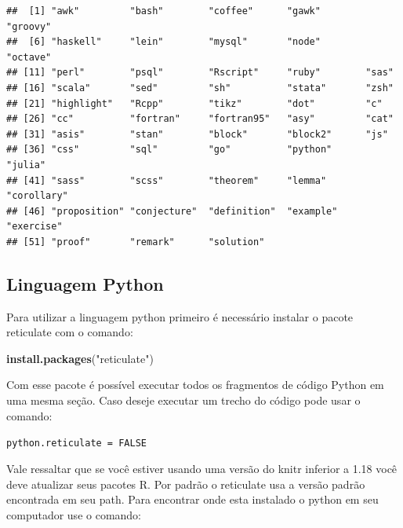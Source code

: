 \documentclass[
]{book}
\newenvironment{Shaded}{\begin{snugshade}}{\end{snugshade}}
\newcommand{\KeywordTok}[1]{\textcolor[rgb]{0.13,0.29,0.53}{\textbf{#1}}}
\newcommand{\NormalTok}[1]{#1}
\newcommand{\OperatorTok}[1]{\textcolor[rgb]{0.81,0.36,0.00}{\textbf{#1}}}
\newcommand{\StringTok}[1]{\textcolor[rgb]{0.31,0.60,0.02}{#1}}
\begin{document}
\begin{Shaded}
\end{Shaded}

\begin{verbatim}
##  [1] "awk"         "bash"        "coffee"      "gawk"        "groovy"     
##  [6] "haskell"     "lein"        "mysql"       "node"        "octave"     
## [11] "perl"        "psql"        "Rscript"     "ruby"        "sas"        
## [16] "scala"       "sed"         "sh"          "stata"       "zsh"        
## [21] "highlight"   "Rcpp"        "tikz"        "dot"         "c"          
## [26] "cc"          "fortran"     "fortran95"   "asy"         "cat"        
## [31] "asis"        "stan"        "block"       "block2"      "js"         
## [36] "css"         "sql"         "go"          "python"      "julia"      
## [41] "sass"        "scss"        "theorem"     "lemma"       "corollary"  
## [46] "proposition" "conjecture"  "definition"  "example"     "exercise"   
## [51] "proof"       "remark"      "solution"
\end{verbatim}

\hypertarget{linguagem-python}{%
\subsection{Linguagem Python}\label{linguagem-python}}

Para utilizar a linguagem python primeiro é necessário instalar o pacote reticulate com o comando:

\begin{Shaded}
\begin{Highlighting}[]
\KeywordTok{install.packages}\NormalTok{(}\StringTok{"reticulate"}\NormalTok{)}
\end{Highlighting}
\end{Shaded}

Com esse pacote é possível executar todos os fragmentos de código Python em uma mesma seção. Caso deseje executar um trecho do código pode usar o comando:

\texttt{python.reticulate\ =\ FALSE}

Vale ressaltar que se você estiver usando uma versão do knitr inferior a 1.18 você deve atualizar seus pacotes R. Por padrão o reticulate usa a versão padrão encontrada em seu path. Para encontrar onde esta instalado o python em seu computador use o comando:
\end{document}
